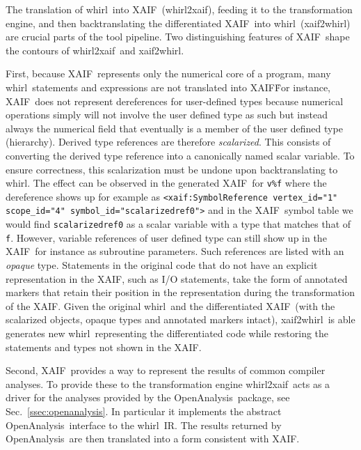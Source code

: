 \documentclass{book}
\newcommand{\OpenAnalysis}{OpenAnalysis}
\newcommand{\xaif}{XAIF}
\newcommand{\whirl}{whirl}
\newcommand{\whirlToxaif}{whirl2xaif}
\newcommand{\xaifTowhirl}{xaif2whirl}
\newcommand{\code}[1]{{\small\tt{#1}}}
\newcommand{\refsec}[1]{{Sec.~\ref{#1}}}
\begin{document}
The translation of \whirl\ into
\xaif\ (\whirlToxaif), feeding it to the transformation engine, and
then backtranslating the differentiated \xaif\ into \whirl\
(\xaifTowhirl) are crucial parts of the tool pipeline.  
Two distinguishing features of \xaif\ shape the
contours of \whirlToxaif\ and \xaifTowhirl.  

First, because \xaif\
represents only the numerical core of a program, many \whirl\
statements and expressions are not translated into \xaif\.  For
instance, \xaif\ does not represent dereferences for user-defined types 
because numerical operations simply will not involve the user defined 
type as such but instead always the numerical field that eventually is a member 
of the user defined type (hierarchy). 
Derived type references are therefore {\em scalarized}. This consists of converting
the derived type reference into a canonically named scalar variable.
To ensure correctness, this scalarization must be undone upon backtranslating 
to \whirl. The effect can be observed in the generated \xaif\ for \code{v\%f} where 
the dereference 
shows up for example 
as \code{<xaif:SymbolReference vertex\_id="1" scope\_id="4" symbol\_id="scalarizedref0"\/>}
and in the \xaif\ symbol table we would find \code{scalarizedref0} as a scalar variable with 
a type that matches that of \code{f}. 
However, variable references of user defined type can still show up in the \xaif\ for 
instance as subroutine parameters. Such references are listed with an 
{\em opaque} type. Statements in the original code that do not have an 
explicit representation in the  \xaif, 
such as I/O statements, take the form of annotated markers that retain 
their position in the representation during the transformation of the \xaif.  
Given the original
\whirl\ and the differentiated \xaif\ (with the scalarized objects, opaque types
and annotated markers intact), \xaifTowhirl\ is able generates new \whirl\ representing the
differentiated code while restoring the statements and types not shown in the \xaif.   

Second, \xaif\ provides a way to represent the results of  common
compiler analyses.  To provide these to the transformation engine 
\whirlToxaif\ acts as a driver for the analyses provided by the 
\OpenAnalysis\ package, see \refsec{ssec:openanalysis}.
In particular it implements the abstract \OpenAnalysis\ interface
to the \whirl\ IR. The results returned by \OpenAnalysis\ are then 
translated into a form consistent with \xaif.
\end{document}
